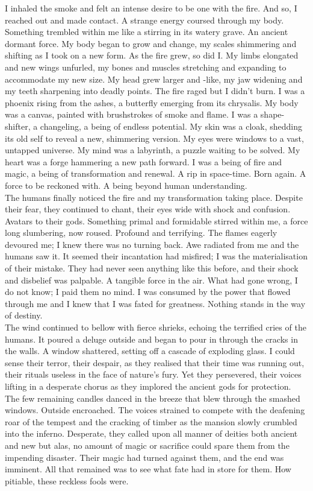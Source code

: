 I inhaled the smoke and felt an intense desire to be one with the fire. And so, I reached out and made contact. A strange energy coursed through my body. Something trembled within me like a  stirring in its watery grave. An ancient dormant force. My body began to grow and change, my scales shimmering and shifting as I took on a new form. As the fire grew, so did I. My limbs elongated and new wings unfurled, my bones and muscles stretching and expanding to accommodate my new size. My head grew larger and -like, my jaw widening and my teeth sharpening into deadly points. The fire raged but I didn't burn. I was a phoenix rising from the ashes, a butterfly emerging from its chrysalis. My body was a canvas, painted with brushstrokes of smoke and flame. I was a shape-shifter, a changeling, a being of endless potential. My skin was a cloak, shedding its old self to reveal a new, shimmering version. My eyes were windows to a vast, untapped universe. My mind was a labyrinth, a puzzle waiting to be solved. My heart was a forge hammering a new path forward. I was a being of fire and magic, a being of transformation and renewal. A rip in space-time. Born again. A force to be reckoned with. A being beyond human understanding. \\

The humans finally noticed the fire and my transformation taking place. Despite their fear, they continued to chant, their eyes wide with shock and confusion. Avatars to their gods. Something primal and formidable stirred within me, a force long slumbering, now roused. Profound and terrifying. The flames eagerly devoured me; I knew there was no turning back. Awe radiated from me and the humans saw it. It seemed their incantation had misfired; I was the materialisation of their mistake. They had never seen anything like this before, and their shock and disbelief was palpable. A tangible force in the air. What had gone wrong, I do not know; I paid them no mind. I was consumed by the power that flowed through me and I knew that I was fated for greatness. Nothing stands in the way of destiny. \\

The wind continued to bellow with fierce shrieks, echoing the terrified cries of the humans. It poured a deluge outside and began to pour in through the cracks in the walls. A window shattered, setting off a cascade of exploding glass. I could sense their terror, their despair, as they realised that their time was running out, their rituals useless in the face of nature's fury. Yet they persevered, their voices lifting in a desperate chorus as they implored the ancient gods for protection. The few remaining candles danced in the breeze that blew through the smashed windows. Outside encroached. The voices strained to compete with the deafening roar of the tempest and the cracking of timber as the mansion slowly crumbled into the inferno. Desperate, they called upon all manner of deities both ancient and new but alas, no amount of magic or sacrifice could spare them from the impending disaster. Their magic had turned against them, and the end was imminent. All that remained was to see what fate had in store for them. How pitiable, these reckless fools were. \\


